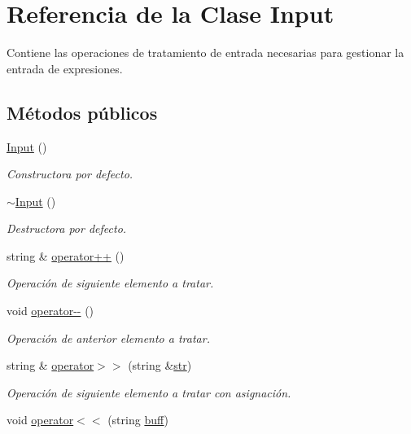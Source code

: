\hypertarget{class_input}{}\section{Referencia de la Clase Input}
\label{class_input}


Contiene las operaciones de tratamiento de entrada necesarias para gestionar la entrada de expresiones.  


\subsection*{Métodos públicos}
\begin{DoxyCompactItemize}
\item 
\hyperlink{class_input_abae3f379d3f157cf42dc857309832dba}{Input} ()
\begin{DoxyCompactList}\small\item\em Constructora por defecto. \end{DoxyCompactList}\item 
\hyperlink{class_input_af2db35ba67c8a8ccd23bef6a482fc291}{$\sim$\+Input} ()
\begin{DoxyCompactList}\small\item\em Destructora por defecto. \end{DoxyCompactList}\item 
string \& \hyperlink{class_input_aacf724a2e4c283f93f5f6d8b38197fca}{operator++} ()
\begin{DoxyCompactList}\small\item\em Operación de siguiente elemento a tratar. \end{DoxyCompactList}\item 
void \hyperlink{class_input_a90b48f4efc407d4434422fa46f279eef}{operator-\/-\/} ()
\begin{DoxyCompactList}\small\item\em Operación de anterior elemento a tratar. \end{DoxyCompactList}\item 
string \& \hyperlink{class_input_a69d637b96f094fa58ad0797b1ef3fec0}{operator$>$$>$} (string \&\hyperlink{class_input_a0c2550eda9a6250028748d8870f4e83f}{str})
\begin{DoxyCompactList}\small\item\em Operación de siguiente elemento a tratar con asignación. \end{DoxyCompactList}\item 
void \hyperlink{class_input_a79630dc9ce45e346ae4b20a457c1b1b3}{operator$<$$<$} (string \hyperlink{class_input_a680019c05e47ad35677d5cb692978d98}{buff})

\end{DoxyCompactItemize}
